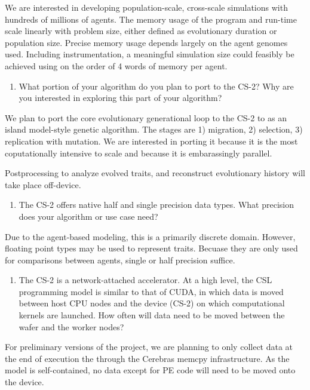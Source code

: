 We are interested in developing population-scale, cross-scale simulations with hundreds of millions of agents.
The memory usage of the program and run-time scale linearly with problem size, either defined as evolutionary duration or population size.
Precise memory usage depends largely on the agent genomes used.
Including instrumentation, a meaningful simulation size could feasibly be achieved using on the order of 4 words of memory per agent.

\begin{enumerate}[resume] \itshape
\item What portion of your algorithm do you plan to port to the CS-2?
Why are you interested in exploring this part of your algorithm?
\end{enumerate}

We plan to port the core evolutionary generational loop to the CS-2 to as an island model-style genetic algorithm.
The stages are 1) migration, 2) selection, 3) replication with mutation.
We are interested in porting it because it is the most coputationally intensive to scale and because it is embarassingly parallel.

Postprocessing to analyze evolved traits, and reconstruct evolutionary history will take place off-device.

\begin{enumerate}[resume] \itshape
\item The CS-2 offers native half and single precision data types.
What precision does your algorithm or use case need?
\end{enumerate}

Due to the agent-based modeling, this is a primarily discrete domain.
However, floating point types may be used to represent traits.
Becuase they are only used for comparisons between agents, single or half precision suffice.

\begin{enumerate}[resume] \itshape
\item The CS-2 is a network-attached accelerator. At a high level, the CSL programming model is similar to that of CUDA, in which data is moved between host CPU nodes and the device (CS-2) on which computational kernels are launched.
How often will data need to be moved between the wafer and the worker nodes?
\end{enumerate}

For preliminary versions of the project, we are planning to only collect data at the end of execution the through the Cerebras memcpy infrastructure.
As the model is self-contained, no data except for PE code will need to be moved onto the device.

